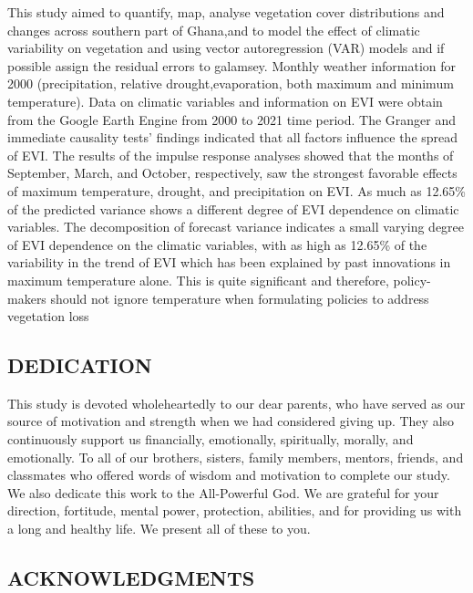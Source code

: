 \documentclass[12pt,a4paper]{book}
\begin{document}
	This study aimed to quantify, map,  analyse vegetation cover distributions and changes across southern part of Ghana,and to model the effect of climatic variability on vegetation and using vector autoregression (VAR) models and if possible assign the residual errors to galamsey. Monthly weather information for 2000 (precipitation, relative drought,evaporation, both maximum and minimum temperature).
	Data on climatic variables and information on EVI were obtain from the Google Earth Engine from 2000 to 2021 time period. The Granger and immediate causality tests' findings indicated that all factors influence the spread of EVI. The results of the impulse response analyses showed that the months of September, March, and October, respectively, saw the strongest favorable effects of maximum temperature, drought, and precipitation on EVI. As much as 12.65\% of the predicted variance shows a different degree of EVI dependence on climatic variables.
	The decomposition of forecast variance indicates a small varying degree of EVI dependence on the climatic variables, with as high as 12.65\% of the variability	in the trend of EVI which has been explained by past innovations in maximum temperature alone. This is quite significant and therefore, policy-makers should not ignore temperature when formulating policies to address vegetation loss
	
	\newpage	
	\begin{center}\section*{DEDICATION}\end{center}
This study is devoted wholeheartedly to our dear parents, who have served as our source of motivation and strength when we had considered giving up. They also continuously support us financially, emotionally, spiritually, morally, and emotionally.
To all of our brothers, sisters, family members, mentors, friends, and classmates who offered words of wisdom and motivation to complete our study.
We also dedicate this work to the All-Powerful God. We are grateful for your direction, fortitude, mental power, protection, abilities, and for providing us with a long and healthy life. We present all of these to you.  
	\newpage	
	\begin{center}\section*{ACKNOWLEDGMENTS}\end{center}
	
\end{document}
